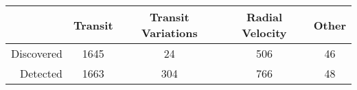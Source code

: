 \begin{tabular}{rcccc}
    \toprule
    & Transit & Transit Variations & Radial Velocity & Other \\
    \midrule
    Discovered & 1645 & 24 & 506 & 46\\
    Detected & 1663 & 304 & 766 & 48\\
    \bottomrule
\end{tabular}



